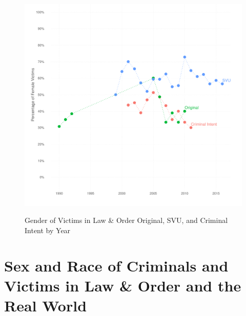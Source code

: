 \documentclass[12pt, letterpaper]{article}
\begin{document}
\begin{figure}[htbp]
\centering
\caption{Gender of Victims in Law \& Order Original, SVU, and Criminal Intent by Year}
\includegraphics[scale=.9]{../figs/all_victims_by_gender_ts.pdf}
\label{fig:victim_sex_ts}
\end{figure}

\clearpage
\section{Sex and Race of Criminals and Victims in Law \& Order and the Real World}
\label{si_tabs}



\clearpage


\clearpage


\clearpage

\end{document}
